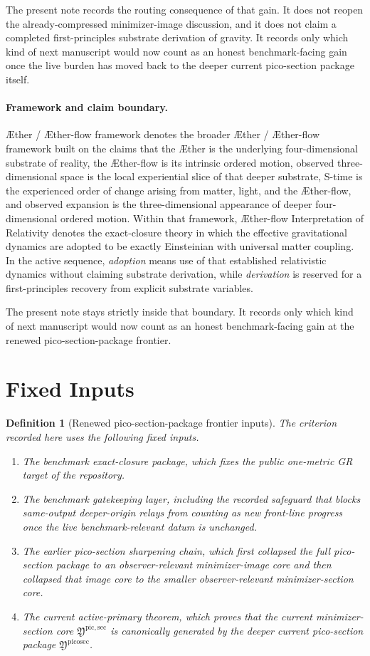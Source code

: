 \documentclass[11pt]{article}
\newcommand{\Aether}{\AE{}ther}
\newcommand{\Aflow}{\AE{}ther-flow}
\newcommand{\TheoryName}{\Aflow{} Interpretation of Relativity}
\newcommand{\TheoryProgram}{\Aether{} / \Aflow{} framework}
\newcommand{\PicoSectionPackage}{\mathfrak Y^{\mathrm{picosec}}}
\newcommand{\PicoMinSectionCore}{\mathfrak Y^{\mathrm{pic,sec}}}
\newtheorem{definition}{Definition}
\begin{document}
The present note records the routing consequence of that gain. It does not reopen the already-compressed minimizer-image discussion, and it does not claim a completed first-principles substrate derivation of gravity. It records only which kind of next manuscript would now count as an honest benchmark-facing gain once the live burden has moved back to the deeper current pico-section package itself.

\paragraph{Framework and claim boundary.}
\TheoryProgram{} denotes the broader \Aether{} / \Aflow{} framework built on the claims that the \Aether{} is the underlying four-dimensional substrate of reality, the \Aflow{} is its intrinsic ordered motion, observed three-dimensional space is the local experiential slice of that deeper substrate, S-time is the experienced order of change arising from matter, light, and the \Aflow{}, and observed expansion is the three-dimensional appearance of deeper four-dimensional ordered motion. Within that framework, \TheoryName{} denotes the exact-closure theory in which the effective gravitational dynamics are adopted to be exactly Einsteinian with universal matter coupling. In the active sequence, \emph{adoption} means use of that established relativistic dynamics without claiming substrate derivation, while \emph{derivation} is reserved for a first-principles recovery from explicit substrate variables.

The present note stays strictly inside that boundary. It records only which kind of next manuscript would now count as an honest benchmark-facing gain at the renewed pico-section-package frontier.

\section{Fixed Inputs}

\begin{definition}[Renewed pico-section-package frontier inputs]
The criterion recorded here uses the following fixed inputs.
\begin{enumerate}
    \item The benchmark exact-closure package, which fixes the public one-metric GR target of the repository.
    \item The benchmark gatekeeping layer, including the recorded safeguard that blocks same-output deeper-origin relays from counting as new front-line progress once the live benchmark-relevant datum is unchanged.
    \item The earlier pico-section sharpening chain, which first collapsed the full pico-section package to an observer-relevant minimizer-image core and then collapsed that image core to the smaller observer-relevant minimizer-section core.
    \item The current active-primary theorem, which proves that the current minimizer-section core \(\PicoMinSectionCore\) is canonically generated by the deeper current pico-section package \(\PicoSectionPackage\).
\end{enumerate}
\end{definition}
\end{document}
